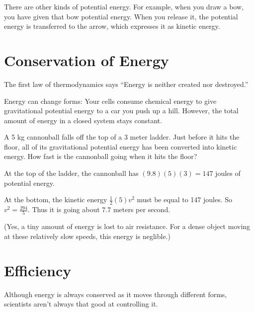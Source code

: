 There are other kinds of potential energy. For example, when you draw
a bow, you have given that bow potential energy. When you release it,
the potential energy is transferred to the arrow, which expresses it
as kinetic energy.

\section{Conservation of Energy}

The first law of thermodynamics says ``Energy is neither created nor
destroyed.''

Energy can change forms: Your cells consume chemical energy to give
gravitational potential energy to a car you push up a hill. However, the total amount of
energy in a closed system stays constant.

\begin{Exercise}[title={The Energy of Falling}, label=energy_falling]
  
A 5 kg cannonball falls off the top of a 3 meter ladder. Just before
it hits the floor, all of its gravitational potential energy has been
converted into kinetic energy.  How fast is the cannonball going when
it hits the floor?

\end{Exercise}
\begin{Answer}[ref=energy_falling]

  At the top of the ladder, the cannonball has $(9.8)(5)(3) = 147$ joules of potential energy.

  At the bottom, the kinetic energy $\frac{1}{2}(5)v^2$ must be equal
  to 147 joules. So $v^2 = \frac{294}{5}$.  Thus it is going about
  $7.7$ meters per second.

  (Yes, a tiny amount of energy is lost to air resistance. For a dense
  object moving at these relatively slow speeds, this energy is
  neglible.)
  
\end{Answer}


\section{Efficiency}

Although energy is always conserved as it moves through different
forms, scientists aren't always that good at controlling it.


